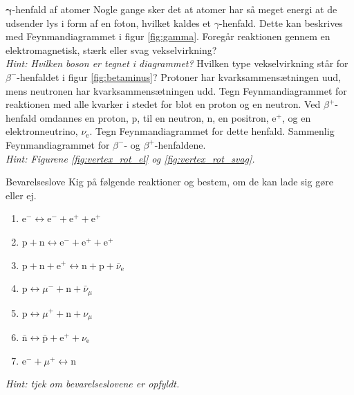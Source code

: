 \begin{opgave}{$\mathbf{\gamma}$-henfald af atomer}
    Nogle gange sker det at atomer har så meget energi at de udsender lys i form af en foton, hvilket kaldes et $\gamma$-henfald. Dette kan beskrives med Feynmandiagrammet i figur \ref{fig:gamma}.
    \opg Foregår reaktionen gennem en elektromagnetisk, stærk eller svag vekselvirkning? \\
    \textit{Hint: Hvilken boson er tegnet i diagrammet?}
    \opg Hvilken type vekselvirkning står for $\beta^-$-henfaldet i figur \ref{fig:betaminus}?
    \opg Protoner har kvarksammensætningen uud, mens neutronen har kvarksammensætningen udd. Tegn Feynmandiagrammet for reaktionen med alle kvarker i stedet for blot en proton og en neutron.
    \opg Ved $\beta^+$-henfald omdannes en proton, p, til en neutron, n, en positron, e$^+$, og en elektronneutrino, $\nu_\mathrm{e}$. Tegn Feynmandiagrammet for dette henfald.
    \opg Sammenlig Feynmandiagrammet for $\beta^-$- og $\beta^+$-henfaldene. \\
    \textit{Hint: Figurene \ref{fig:vertex_rot_el} og \ref{fig:vertex_rot_svag}.}
\end{opgave}

\begin{opgave}{Bevarelseslove}
    \opg Kig på følgende reaktioner og bestem, om de kan lade sig gøre eller ej.
    \begin{enumerate}
        \item $\mathrm{e}^- \longleftrightarrow \mathrm{e}^- + \mathrm{e}^+ + \mathrm{e}^+$
        \item $\mathrm{p} + \mathrm{n} \longleftrightarrow \mathrm{e}^- + \mathrm{e}^+ + \mathrm{e}^+$
        \item $\mathrm{p} + \mathrm{n} + \mathrm{e}^+ \longleftrightarrow \mathrm{n} + \mathrm{p} + \bar{\nu}_\mathrm{e}$
        \item $\mathrm{p} \longleftrightarrow \mu^- + \mathrm{n} + \bar{\nu}_\mu $
        \item $\mathrm{p} \longleftrightarrow \mu^+ + \mathrm{n} + \nu_\mu $
        \item $\bar{\mathrm{n}} \longleftrightarrow \bar{\mathrm{p}} + \mathrm{e}^+ + \nu_\mathrm{e}$
        \item $\mathrm{e}^- + \mu^+ \longleftrightarrow \text{n}$
    \end{enumerate}
    \emph{Hint: tjek om bevarelseslovene er opfyldt.}
\end{opgave}

\newpage

